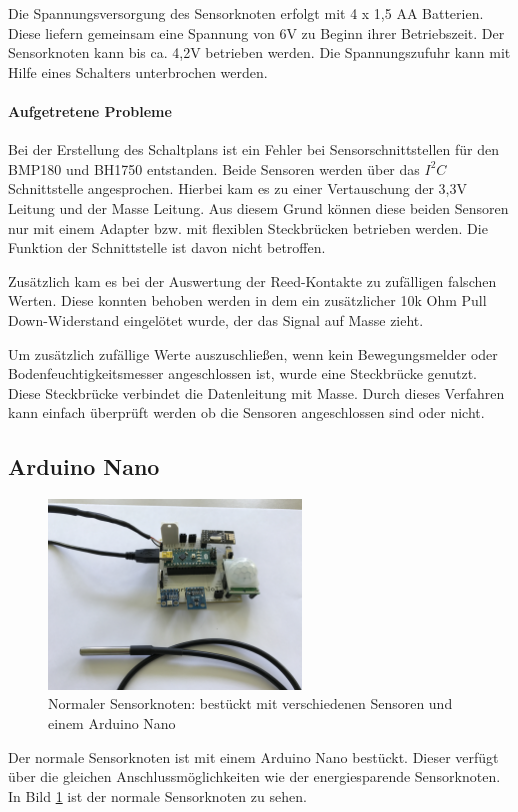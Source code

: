 Die Spannungsversorgung des Sensorknoten erfolgt mit 4 x 1,5 AA Batterien. Diese liefern gemeinsam eine Spannung von 6V zu Beginn ihrer Betriebszeit. Der Sensorknoten kann bis ca. 4,2V betrieben werden. Die Spannungszufuhr kann mit Hilfe eines Schalters unterbrochen werden. 
\paragraph{Aufgetretene Probleme} \label{sec:hwproblem} Bei der Erstellung des Schaltplans ist ein Fehler bei Sensorschnittstellen für den BMP180 und BH1750 entstanden. Beide Sensoren werden über das $I^2C$ Schnittstelle angesprochen. Hierbei kam es zu einer Vertauschung der 3,3V Leitung und der Masse Leitung. Aus diesem Grund können diese beiden Sensoren nur mit einem Adapter bzw. mit flexiblen Steckbrücken betrieben werden. Die Funktion der Schnittstelle ist davon nicht betroffen. 

Zusätzlich kam es bei der Auswertung der Reed-Kontakte zu zufälligen falschen Werten. Diese konnten behoben werden in dem ein zusätzlicher 10k Ohm Pull Down-Widerstand eingelötet wurde, der das Signal auf Masse zieht.

Um zusätzlich zufällige Werte auszuschließen, wenn kein Bewegungsmelder oder Bodenfeuchtigkeitsmesser angeschlossen ist, wurde eine Steckbrücke genutzt. Diese Steckbrücke verbindet die Datenleitung mit Masse. Durch dieses Verfahren kann einfach überprüft werden ob die Sensoren angeschlossen sind oder nicht.
\label{sec:ArduinoProMini}
\subsection{Arduino Nano}
\label{sec:ArduinoNano}
\begin{figure}
	\centering
	\includegraphics[width=0.6\textwidth]{bilder/SensorknotenArduinoNano}
	\caption[Normaler Sensorknoten]{Normaler Sensorknoten: bestückt mit verschiedenen Sensoren und einem Arduino Nano}
	\label{img:ArduinoNano}
\end{figure}
Der normale Sensorknoten ist mit einem Arduino Nano bestückt. Dieser verfügt über die gleichen Anschlussmöglichkeiten wie der energiesparende Sensorknoten. In Bild \ref{img:ArduinoNano} ist der normale Sensorknoten zu sehen.
